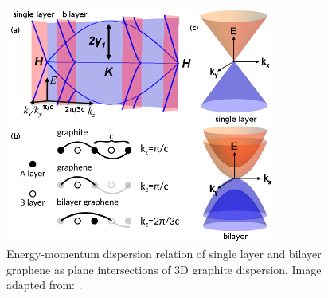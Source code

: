 \begin{figure}[htbp!] 
\centering  
\includegraphics[width=0.8\textwidth]{gra_band.png}
\caption{Energy-momentum dispersion relation of single layer and bilayer graphene as plane intersections of 3D graphite dispersion. Image adapted from: \cite{Mak2010}. }  
\label{fig:gra_bands}
\end{figure} 

